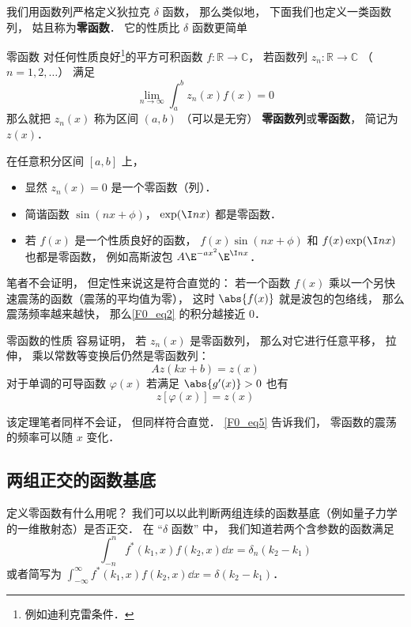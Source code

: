 
我们用函数列严格定义狄拉克 $\delta$ 函数， 那么类似地， 下面我们也定义一类函数列， 姑且称为\textbf{零函数}． 它的性质比 $\delta$ 函数更简单
\begin{definition}{零函数}
对任何性质良好\footnote{例如迪利克雷条件．}的平方可积函数 $f: \mathbb R \to \mathbb C$， 若函数列 $z_n: \mathbb R \to \mathbb C$ （$n = 1, 2, \dots$） 满足
\begin{equation}\label{F0_eq2}
\lim_{n\to \infty}\int_{a}^{b} z_n(x) f(x) = 0
\end{equation}
那么就把 $z_n(x)$ 称为区间 $(a,b)$ （可以是无穷） \textbf{零函数列}或\textbf{零函数}， 简记为 $z(x)$．
\end{definition}

\begin{example}{}\label{F0_ex1}
在任意积分区间 $[a,b]$ 上，
\begin{itemize}
\item 显然 $z_n(x) = 0$ 是一个零函数（列）．
\item 简谐函数 $\sin(nx + \phi)$， $\exp(\I n x)$ 都是零函数．
\item 若 $f(x)$ 是一个性质良好的函数， $f(x)\sin(nx + \phi)$ 和 $f(x)\exp(\I n x)$ 也都是零函数， 例如高斯波包 $A\E^{-ax^2}\E^{\I nx}$．
\end{itemize}

笔者不会证明， 但定性来说这是符合直觉的： 若一个函数 $f(x)$ 乘以一个另快速震荡的函数（震荡的平均值为零）， 这时 $\abs{f(x)}$ 就是波包的包络线， 那么震荡频率越来越快， 那么\autoref{F0_eq2} 的积分越接近 $0$．
\end{example}

\begin{theorem}{零函数的性质}
容易证明， 若 $z_n(x)$ 是零函数列， 那么对它进行任意平移， 拉伸， 乘以常数等变换后仍然是零函数列：
\begin{equation}
A z(kx + b) = z(x)
\end{equation}
对于单调的可导函数 $\varphi(x)$ 若满足 $\abs{g'(x)} > 0$ 也有
\begin{equation}\label{F0_eq5}
z[\varphi(x)] = z(x)
\end{equation}
\end{theorem}
该定理笔者同样不会证， 但同样符合直觉． \autoref{F0_eq5} 告诉我们， 零函数的震荡的频率可以随 $x$ 变化．

\subsection{两组正交的函数基底}
定义零函数有什么用呢？ 我们可以以此判断两组连续的函数基底（例如量子力学的一维散射态）是否正交． 在 “$\delta$ 函数” 中， 我们知道若两个含参数的函数满足
\begin{equation}\label{F0_eq1}
\int_{-n}^{n} f^*(k_1, x) f(k_2, x)\dd{x} = \delta_n(k_2 - k_1)
\end{equation}
或者简写为 $\int_{-\infty}^{\infty} f^*(k_1, x) f(k_2, x)\dd{x} = \delta(k_2 - k_1)$．


